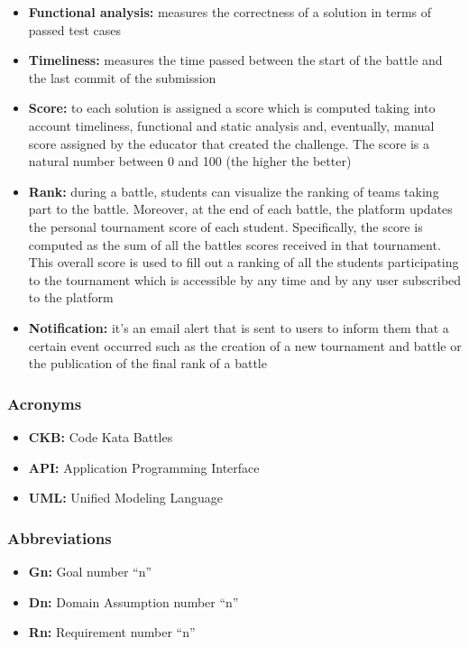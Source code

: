 \begin{itemize}
    \item {\textbf{Functional analysis:} measures the correctness of a solution in terms of passed test cases}
    \item {\textbf{Timeliness:} measures the time passed between the start of the battle and the last commit of the submission}
    \item {\textbf{Score:} to each solution is assigned a score which is computed taking into account timeliness, functional and static analysis and, eventually, manual score assigned by the educator that created the challenge. The score is a natural number between 0 and 100 (the higher the better)}
    \item {\textbf{Rank:} during a battle, students can visualize the ranking of teams taking part to the battle. Moreover, at the end of each battle, the platform updates the personal tournament score of each student. Specifically, the score is computed as the sum of all the battles scores received in that tournament. This overall score is used to fill out a ranking of all the students participating to the tournament which is accessible by any time and by any user subscribed to the platform}
    \item {\textbf{Notification:} it's an  email alert that is sent to users to inform them that a certain event occurred such as the creation of a new tournament and battle or the publication of the final rank of a battle}

\end{itemize}
\subsubsection{Acronyms}
\begin{itemize}
    \item {\textbf{CKB:} Code Kata Battles}
    \item {\textbf{API:} Application Programming Interface}
    \item {\textbf{UML:} Unified Modeling Language}
\end{itemize}
\subsubsection{Abbreviations}
\begin{itemize}
    \item {\textbf{Gn:} Goal number “n”}
    \item {\textbf{Dn:} Domain Assumption number “n”}
    \item {\textbf{Rn:} Requirement number “n”}
\end{itemize}
